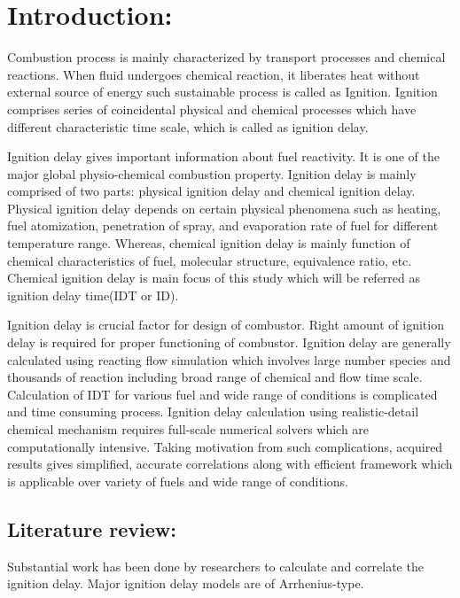 \documentclass[preprint,12pt]{elsarticle}
\begin{document}
	\linenumbers
	
	\section{Introduction:}
	\label{S:1}
	Combustion process is mainly characterized by transport processes and chemical reactions. When fluid undergoes chemical reaction, it liberates heat without external source of energy such sustainable process is called as Ignition. Ignition comprises series of coincidental physical and chemical processes which have different characteristic time scale, which is called as ignition delay. 
	
	Ignition delay gives important information about fuel reactivity. It is one of the major global physio-chemical combustion property. Ignition delay is mainly comprised of two parts: physical ignition delay and chemical ignition delay. Physical ignition delay depends on certain physical phenomena such as heating, fuel atomization, penetration of spray, and evaporation rate of fuel for different temperature range. Whereas, chemical ignition delay is mainly function of chemical characteristics of fuel, molecular structure, equivalence ratio, etc. Chemical ignition delay is main focus of this study which will be referred as ignition delay time(IDT or ID). 
	
		Ignition delay is crucial factor for design of combustor. Right amount of ignition delay is required for proper  functioning of combustor. Ignition delay are generally calculated using reacting flow simulation which involves large number species and thousands of reaction including broad range of chemical and flow time scale. Calculation of IDT for various fuel and wide range of conditions is complicated and time consuming  process. Ignition delay calculation using realistic-detail chemical mechanism  requires full-scale numerical solvers which are computationally intensive.\cite{computation} Taking motivation from such complications, acquired results gives simplified, accurate correlations along with  efficient framework which is  applicable over variety of fuels and wide range of conditions. 
		
	\subsection{Literature review:}
		Substantial work has been done by researchers to calculate and correlate the ignition delay. Major ignition delay models are of Arrhenius-type.  
		
\end{document}
